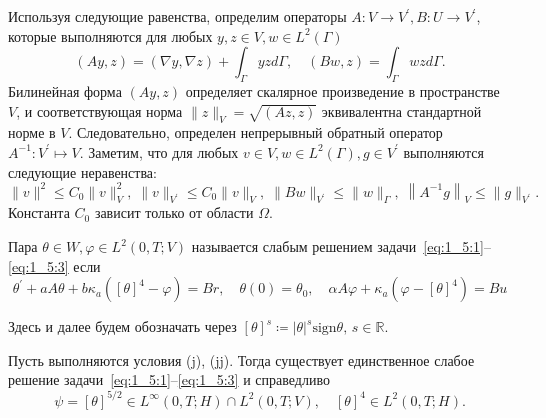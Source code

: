 Используя следующие равенства, определим операторы $A: V \rightarrow V^{\prime}, B: U \rightarrow V^{\prime}$,
которые выполняются для любых $y, z \in V, w \in L^{2}(\Gamma)$
\[
    (A y, z)=(\nabla y, \nabla z)+\int_{\Gamma} y z d \Gamma, \quad(B w, z)=\int_{\Gamma} w z d \Gamma.
\]
Билинейная форма $(A y, z)$ определяет скалярное произведение в пространстве $V$,
и соответствующая норма $\|z\|_{V}=\sqrt{(A z, z)}$ эквивалентна стандартной норме в $V$.
Следовательно, определен непрерывный обратный оператор
$A^{-1}: V^{\prime} \mapsto V$.
Заметим, что для любых $v \in V, w \in L^{2}(\Gamma), g \in V^{\prime}$
выполняются следующие неравенства:
\[
    \|v\|^{2} \leq C_{0}\|v\|_{V}^{2}, \; \|v\|_{V^{\prime}} \leq C_{0}\|v\|_{V}, \;
    \|B w\|_{V^{\prime}} \leq\|w\|_{\Gamma}, \; \left\|A^{-1} g\right\|_{V} \leq\|g\|_{V^{\prime}}.
\]
Константа $C_0$ зависит только от области $\Omega$.

\begin{definition}
    Пара $\theta \in W, \varphi \in L^{2}(0, T ; V)$
    называется слабым решением задачи~\eqref{eq:1_5:1}--\eqref{eq:1_5:3}
    если
    \begin{equation}
        \label{eq:1_5:weak}
        \theta^{\prime}+a A \theta+b \kappa_{a}\left([\theta]^{4}-\varphi\right)=B r,
        \quad \theta(0)=\theta_{0}, \quad \alpha A \varphi+\kappa_{a}\left(\varphi-[\theta]^{4}\right)=B u
    \end{equation}
\end{definition}
Здесь и далее будем обозначать через
$[\theta]^s \coloneqq |\theta|^s \mathrm{sign}\theta,\,s  \in \mathbb{R}$.
\begin{lemma}
    \label{lm:1_5:1}
    Пусть выполняются условия (j), (jj).
    Тогда существует единственное слабое решение задачи~\eqref{eq:1_5:1}--\eqref{eq:1_5:3} и справедливо
    \[
        \psi=[\theta]^{5 / 2} \in L^{\infty}(0, T ; H) \cap L^{2}(0, T ; V),
        \quad[\theta]^{4} \in L^{2}(0, T ; H).
    \]
\end{lemma}

